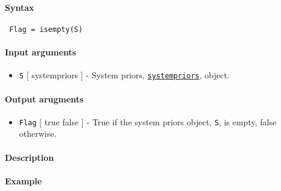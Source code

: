 


	\paragraph{Syntax}
 
 \begin{verbatim}
 Flag = isempty(S)
 \end{verbatim}
 
 \paragraph{Input arguments}
 
 \begin{itemize}
 \item
   \texttt{S} {[} systempriors {]} - System priors,
   \href{systempriors/Contents}{\texttt{systempriors}}, object.
 \end{itemize}
 
 \paragraph{Output arugments}
 
 \begin{itemize}
 \item
   \texttt{Flag} {[} true \textbar{} false {]} - True if the system
   priors object, \texttt{S}, is empty, false otherwise.
 \end{itemize}
 
 \paragraph{Description}
 
 \paragraph{Example}


